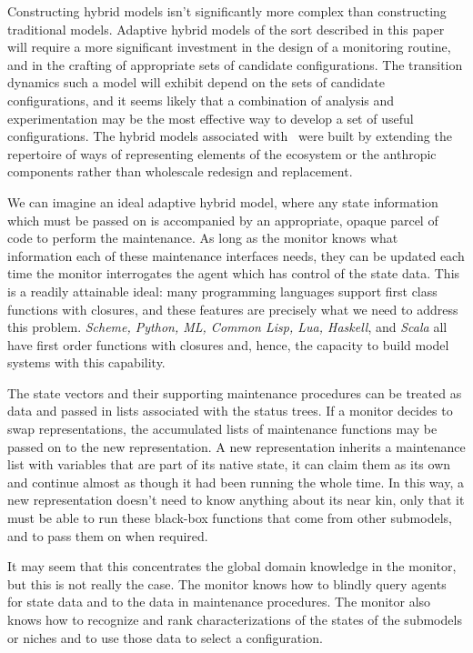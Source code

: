 Constructing hybrid models isn't significantly more complex than
constructing traditional models. Adaptive hybrid models of the sort
described in this paper will require a more significant investment in
the design of a monitoring routine, and in the crafting of appropriate
sets of candidate con\-fig\-ur\-a\-tions.  The transition dynamics such a
model will exhibit depend on the sets of candidate con\-fig\-ur\-a\-tions, and
it seems likely that a combination of analysis and experimentation may
be the most effective way to develop a set of useful con\-fig\-ur\-a\-tions.
The hybrid models associated with~\cite{lyne1994pmez5, little2006nws,
  fulton2009crossingscales} were built by extending the repertoire of ways of
representing elements of the ecosystem or the anthropic components
rather than wholescale redesign and replacement.

We can imagine an ideal adaptive hybrid model, where any state
information which must be passed on is accompanied by an appropriate,
opaque parcel of code to perform the maintenance. As long as the
monitor knows what information each of these maintenance interfaces
needs, they can be updated each time the monitor interrogates the
agent which has control of the state data.  This is a readily
attainable ideal: many programming languages support first class
functions with closures, and these features are precisely what we need
to address this problem.  \textsl{Scheme, Python, ML, Common Lisp,
  Lua, Haskell}, and \textsl{Scala} all have first order functions
with closures and, hence, the capacity to build model systems with this
capability.

The state vectors and their supporting maintenance procedures can be
treated as data and passed in lists associated with the status
trees. If a monitor decides to swap rep\-re\-sen\-ta\-tions, the accumulated
lists of maintenance functions may be passed on to the new
rep\-re\-sen\-ta\-tion.  A new rep\-re\-sen\-ta\-tion inherits a maintenance list with
variables that are part of its native state, it can claim them as its
own and continue almost as though it had been running the whole
time. In this way, a new rep\-re\-sen\-ta\-tion doesn't need to know anything
about its near kin, only that it must be able to run these black-box
functions that come from other sub\-models, and to pass them on when
required.

It may seem that this concentrates the global domain knowledge in the
monitor, but this is not really the case.  The monitor knows how to
blindly query agents for state data and to the data in maintenance
procedures. The monitor also knows how to recognize and rank
characterizations of the states of the submodels or niches and to use
those data to select a con\-fig\-ur\-a\-tion.

